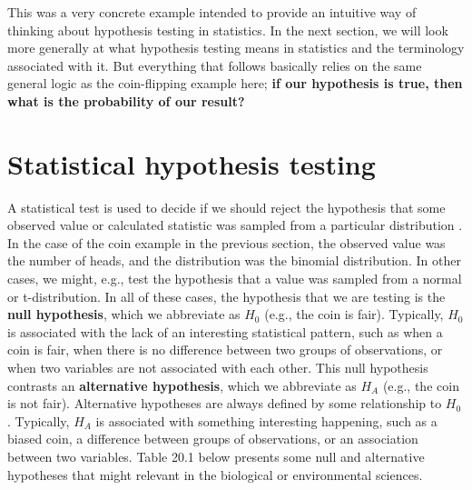 \documentclass[
]{scrbook}
\begin{document}
This was a very concrete example intended to provide an intuitive way of thinking about hypothesis testing in statistics.
In the next section, we will look more generally at what hypothesis testing means in statistics and the terminology associated with it.
But everything that follows basically relies on the same general logic as the coin-flipping example here; \textbf{if our hypothesis is true, then what is the probability of our result?}

\hypertarget{statistical-hypothesis-testing}{%
\section{Statistical hypothesis testing}\label{statistical-hypothesis-testing}}

A statistical test is used to decide if we should reject the hypothesis that some observed value or calculated statistic was sampled from a particular distribution \citep{Sokal1995}.
In the case of the coin example in the previous section, the observed value was the number of heads, and the distribution was the binomial distribution.
In other cases, we might, e.g., test the hypothesis that a value was sampled from a normal or t-distribution.
In all of these cases, the hypothesis that we are testing is the \textbf{null hypothesis}, which we abbreviate as \(H_{0}\) (e.g., the coin is fair).
Typically, \(H_{0}\) is associated with the lack of an interesting statistical pattern, such as when a coin is fair, when there is no difference between two groups of observations, or when two variables are not associated with each other.
This null hypothesis contrasts an \textbf{alternative hypothesis}, which we abbreviate as \(H_{A}\) (e.g., the coin is not fair).
Alternative hypotheses are always defined by some relationship to \(H_{0}\) \citep{Sokal1995}.
Typically, \(H_{A}\) is associated with something interesting happening, such as a biased coin, a difference between groups of observations, or an association between two variables.
Table 20.1 below presents some null and alternative hypotheses that might relevant in the biological or environmental sciences.
\end{document}
